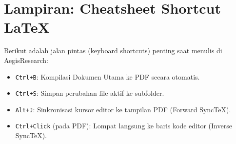 \section*{Lampiran: Cheatsheet Shortcut LaTeX}
Berikut adalah jalan pintas (keyboard shortcuts) penting saat menulis di AegisResearch:
\begin{itemize}
    \item \texttt{Ctrl+B}: Kompilasi Dokumen Utama ke PDF secara otomatis.
    \item \texttt{Ctrl+S}: Simpan perubahan file aktif ke subfolder.
    \item \texttt{Alt+J}: Sinkronisasi kursor editor ke tampilan PDF (Forward SyncTeX).
    \item \texttt{Ctrl+Click} (pada PDF): Lompat langsung ke baris kode editor (Inverse SyncTeX).
\end{itemize}
